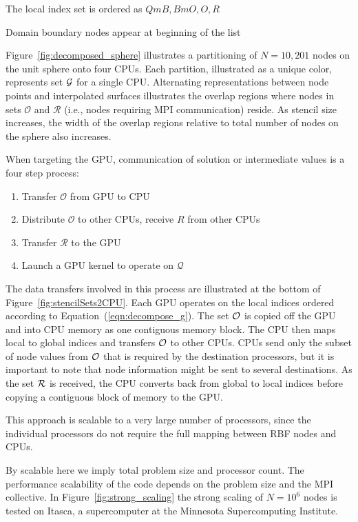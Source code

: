 \documentclass{report}
\begin{document}
\authnote{} The local index set is ordered as ${QmB, BmO, O, R}$ 

\authnote{} Domain boundary nodes appear at beginning of the list 

Figure~\ref{fig:decomposed_sphere} illustrates a partitioning of
$N=10,201$ nodes on the unit sphere onto four CPUs. Each partition, illustrated
as a unique color, represents set $\mathcal{G}$ for a single CPU.  Alternating
representations between node points and interpolated surfaces illustrates the
overlap regions where nodes in sets $\mathcal{O}$ and $\mathcal{R}$ (i.e., nodes
requiring MPI communication) reside. As stencil size increases, the width of the
overlap regions relative to total number of nodes on the sphere also increases. 




When targeting the GPU, communication of solution or intermediate values is a four step process:
        \begin{enumerate}
    \item Transfer $\mathcal{O}$ from GPU to CPU
	\item Distribute $\mathcal{O}$ to other CPUs, receive $R$ from other CPUs
	\item Transfer $\mathcal{R}$ to the GPU
	\item Launch a GPU kernel to operate on $\mathcal{Q}$
     \end{enumerate} 
The data transfers involved in this process are illustrated at the bottom of Figure~\ref{fig:stencilSets2CPU}.
    Each GPU operates on the local indices ordered 
according to Equation~(\ref{eqn:decompose_g}). The set 
$\mathcal{O}$ is copied off the GPU and into CPU memory as one contiguous memory block. The CPU then maps local to global indices and transfers $\mathcal{O}$ to other CPUs. CPUs send only the subset of node values from $\mathcal{O}$ that is required by the destination processors, but it is important to note that node information might be sent to several destinations. 
As the set $\mathcal{R}$ is received, the CPU converts back from global to local indices before copying a contiguous block of memory to the GPU. 

        This approach is scalable to a very large number of 
		processors, since the individual processors do not require the 
		full mapping between RBF nodes and CPUs. 
		
		By scalable here we imply total problem size and processor count. The performance scalability of the code depends on the problem size and the MPI collective. In Figure~\ref{fig:strong_scaling} the strong scaling of $N=10^6$ nodes is tested on Itasca, a supercomputer at the Minnesota Supercomputing Institute.   
\end{document}
